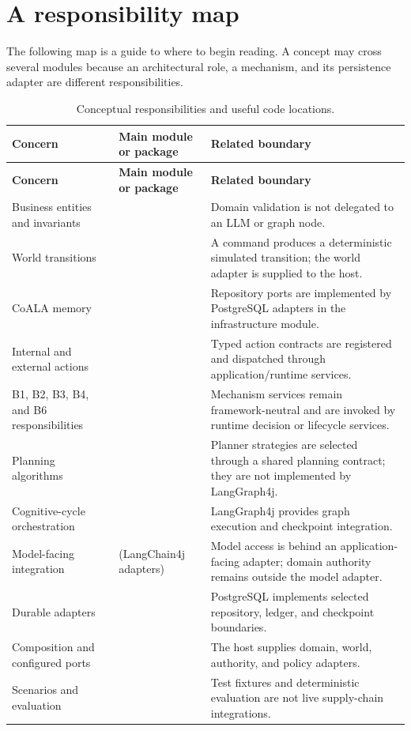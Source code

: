 \section{A responsibility map}

The following map is a guide to where to begin reading. A concept may cross several modules because an architectural role, a mechanism, and its persistence adapter are different responsibilities.

\begin{longtable}{P{0.23\textwidth} P{0.32\textwidth} P{0.33\textwidth}}
\caption{Conceptual responsibilities and useful code locations.}\label{tab:appendix-a-crosswalk}\\
\toprule
\textbf{Concern} & \textbf{Main module or package} & \textbf{Related boundary} \\
\midrule
\endfirsthead
\toprule
\textbf{Concern} & \textbf{Main module or package} & \textbf{Related boundary} \\
\midrule
\endhead
Business entities and invariants &  & Domain validation is not delegated to an LLM or graph node. \\
World transitions &  & A command produces a deterministic simulated transition; the world adapter is supplied to the host. \\
CoALA memory &  & Repository ports are implemented by PostgreSQL adapters in the infrastructure module. \\
Internal and external actions &  & Typed action contracts are registered and dispatched through application/runtime services. \\
B1, B2, B3, B4, and B6 responsibilities &  & Mechanism services remain framework-neutral and are invoked by runtime decision or lifecycle services. \\
Planning algorithms &  & Planner strategies are selected through a shared planning contract; they are not implemented by LangGraph4j. \\
Cognitive-cycle orchestration &  & LangGraph4j provides graph execution and checkpoint integration. \\
Model-facing integration &  (LangChain4j adapters) & Model access is behind an application-facing adapter; domain authority remains outside the model adapter. \\
Durable adapters &  & PostgreSQL implements selected repository, ledger, and checkpoint boundaries. \\
Composition and configured ports &  & The host supplies domain, world, authority, and policy adapters. \\
Scenarios and evaluation &  & Test fixtures and deterministic evaluation are not live supply-chain integrations. \\
\bottomrule
\end{longtable}

